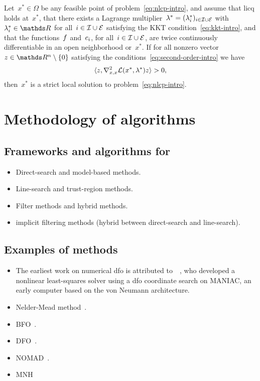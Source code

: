 \begin{theorem}
    Let~$x^{\ast} \in \Omega$ be any feasible point of problem~\cref{eq:nlcp-intro}, and assume that \gls{licq} holds at~$x^{\ast}$, that there exists a Lagrange multiplier~$\lambda^{\ast} = (\lambda_i^{\ast})_{i \in \mathcal{I} \cup \mathcal{E}}$ with~$\lambda_i^{\ast} \in \R$ for all~$i \in \mathcal{I} \cup \mathcal{E}$ satisfying the KKT condition~\cref{eq:kkt-intro}, and that the functions~$f$ and~$c_{i}$, for all~$i \in \mathcal{I} \cup \mathcal{E}$, are twice continuously differentiable in an open neighborhood or~$x^{\ast}$.
    If for all nonzero vector~$z \in \R^n \setminus \set{0}$ satisfying the conditions~\cref{eq:second-order-intro} we have
    \begin{equation*}
        \langle z, \nabla_{x, x}^2 \mathcal{L}(x^{\ast}, \lambda^{\ast}) z\rangle > 0,
    \end{equation*}
    then~$x^{\ast}$ is a strict local solution to problem~\cref{eq:nlcp-intro}.
\end{theorem}

\section{Methodology of  algorithms}

\subsection{Frameworks and algorithms for }

\begin{itemize}
    \item Direct-search and model-based methods.
    \item Line-search and trust-region methods.
    \item Filter methods and hybrid methods.
    \item implicit filtering methods (hybrid between direct-search and line-search).
\end{itemize}

\subsection{Examples of  methods}

\begin{itemize}
    \item The earliest work on numerical \gls{dfo} is attributed to~\citeauthor{Fermi_Metropolis_1952}~\cite{Fermi_Metropolis_1952}, who developed a nonlinear least-squares solver using a \gls{dfo} coordinate search on MANIAC, an early computer based on the von Neumann architecture.
    \item Nelder-Mead method~\cite{Nelder_Mead_1965}.
    \item BFO~\cite{Porcelli_Toint_2017}.
    \item DFO~\cite{Conn_Scheinberg_Toint_1998}.
    \item NOMAD~\cite{Digabel_2011}.
    \item MNH~\cite{Wild_2008}
\end{itemize}

